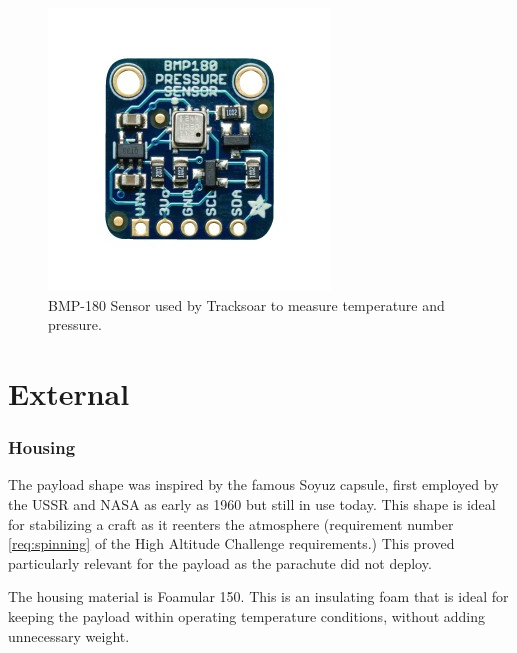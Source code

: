\documentclass[english]{report}
\begin{document}
\begin{figure}[H]
\begin{centering}
\includegraphics{./images/bmp}
\par\end{centering}
\caption{BMP-180 Sensor used by Tracksoar to measure temperature and pressure.}
\end{figure}



\part{External}
\label{part:external}

\section{Housing}

The payload shape was inspired by the famous Soyuz capsule, first
employed by the USSR and NASA as early as 1960 but still in use today.  This shape is ideal for stabilizing a craft as it reenters the atmosphere (requirement number \ref{req:spinning} of the High Altitude Challenge requirements.)  This proved particularly relevant for the payload as the parachute did not deploy.

The housing material is Foamular 150.  This is an insulating foam that is ideal for keeping the payload within operating temperature conditions, without adding unnecessary weight.
\end{document}
